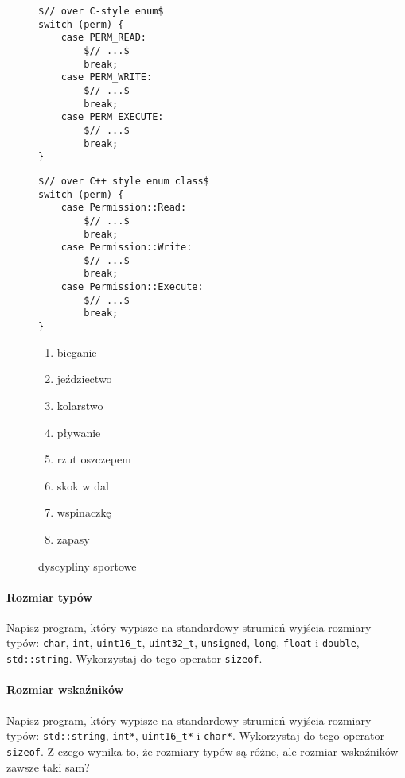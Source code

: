 \documentclass[11pt,a4paper,titlepage,onecolumn]{article}
\begin{document}
\begin{figure}
{\small
\begin{lstlisting}[caption={instrukcja switch (po \texttt{enum})},
    captionpos=b,
    label=listing_0017_switch_statement_over_enum]
$// over C-style enum$
switch (perm) {
    case PERM_READ:
        $// ...$
        break;
    case PERM_WRITE:
        $// ...$
        break;
    case PERM_EXECUTE:
        $// ...$
        break;
}
\end{lstlisting}}
\end{figure}

\begin{figure}
{\small
\begin{lstlisting}[caption={instrukcja switch (po \texttt{enum class})},
    captionpos=b,
    label=listing_0017_switch_statement_over_enum_class]
$// over C++ style enum class$
switch (perm) {
    case Permission::Read:
        $// ...$
        break;
    case Permission::Write:
        $// ...$
        break;
    case Permission::Execute:
        $// ...$
        break;
}
\end{lstlisting}}
\end{figure}

\begin{figure}
\begin{enumerate}
    \item bieganie
    \item jeździectwo
    \item kolarstwo
    \item pływanie
    \item rzut oszczepem
    \item skok w dal
    \item wspinaczkę
    \item zapasy
\end{enumerate}
\caption{dyscypliny sportowe}
\label{fig_0001_sport}
\end{figure}

\paragraph{Rozmiar typów} Napisz program, który wypisze
na standardowy strumień wyjścia rozmiary typów: \texttt{char}, \texttt{int},
\texttt{uint16\_t}, \texttt{uint32\_t}, \texttt{unsigned}, \texttt{long},
\texttt{float} i \texttt{double}, \texttt{std::string}. Wykorzystaj do tego
operator \texttt{sizeof}.

\paragraph{Rozmiar wskaźników} Napisz program, który wypisze na standardowy
strumień wyjścia rozmiary typów: \texttt{std::string}, \texttt{int*},
\texttt{uint16\_t*} i \texttt{char*}. Wykorzystaj do tego operator
\texttt{sizeof}. Z czego wynika to, że rozmiary typów są różne, ale rozmiar
wskaźników zawsze taki sam?
\end{document}
